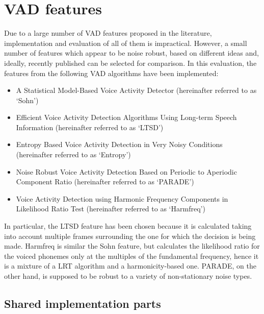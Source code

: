 
\section{VAD features}

Due to a large number of VAD features proposed in the literature, implementation and evaluation of all of them is impractical. However, a small number of features which appear to be noise robust, based on different ideas and, ideally, recently published can be selected for comparison. In this evaluation, the features from the following VAD algorithms have been implemented:

\begin{itemize}
\item A Statistical Model-Based Voice Activity Detector \cite{Sohn} (hereinafter referred to as `Sohn')
\item Efficient Voice Activity Detection Algorithms Using Long-term Speech Information \cite{LTSD} (hereinafter referred to as `LTSD')
\item Entropy Based Voice Activity Detection in Very Noisy Conditions \citep{Renevey} (hereinafter referred to as `Entropy')
\item Noise Robust Voice Activity Detection Based on Periodic to Aperiodic Component Ratio \cite{PARADE} (hereinafter referred to as `PARADE')
\item Voice Activity Detection using Harmonic Frequency Components in Likelihood Ratio Test \cite{Tan} (hereinafter referred to as `Harmfreq')
\end{itemize}

In particular, the LTSD feature has been chosen because it is calculated taking into account multiple frames surrounding the one for which the decision is being made. Harmfreq is similar the Sohn feature, but calculates the likelihood ratio for the voiced phonemes only at the multiples of the fundamental frequency, hence it is a mixture of a LRT algorithm and a harmonicity-based one. PARADE, on the other hand, is supposed to be robust to a variety of non-stationary noise types.

\subsection{Shared implementation parts}

